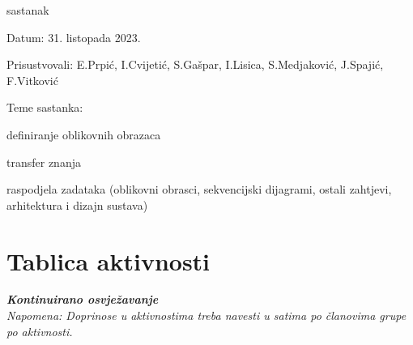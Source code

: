\begin{packed_enum}
			\item  sastanak
			\item[] \begin{packed_item}
				\item Datum: 31. listopada 2023.
				\item Prisustvovali: E.Prpić, I.Cvijetić, S.Gašpar, I.Lisica, S.Medjaković, J.Spajić, F.Vitković
				\item Teme sastanka:
				\begin{packed_item}
					\item  definiranje oblikovnih obrazaca
					\item  transfer znanja
					\item  raspodjela zadataka (oblikovni obrasci, sekvencijski dijagrami, ostali zahtjevi, arhitektura i dizajn sustava)
				\end{packed_item}
			\end{packed_item}
			
		\end{packed_enum}
		
		\eject
		\section*{Tablica aktivnosti}
		
			\textbf{\textit{Kontinuirano osvježavanje}}\\
			
			 \textit{Napomena: Doprinose u aktivnostima treba navesti u satima po članovima grupe po aktivnosti.}

